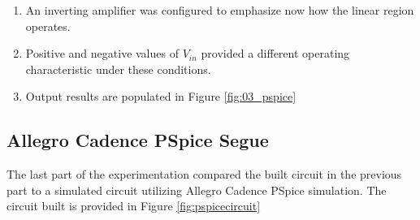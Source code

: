 \documentclass[12pt]{article}
\begin{document}
\begin{enumerate}
	\item An inverting amplifier was configured to emphasize now how the linear
	      region operates.
	\item Positive and negative values of \(V_{in}\) provided a different
	      operating characteristic under these conditions.
	\item Output results are populated in Figure \ref{fig:03_pspice}
\end{enumerate}

\subsection{Allegro Cadence PSpice Segue}
The last part of the experimentation compared the built circuit in the previous
part to a simulated circuit utilizing Allegro Cadence PSpice simulation. The
circuit built is provided in Figure \ref{fig:pspicecircuit}
\end{document}
